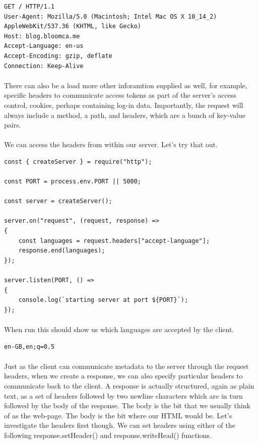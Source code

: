 \documentclass[10pt, a4paper, twosize]{article}
\begin{document}
\begin{lstlisting}
GET / HTTP/1.1
User-Agent: Mozilla/5.0 (Macintosh; Intel Mac OS X 10_14_2) AppleWebKit/537.36 (KHTML, like Gecko)
Host: blog.bloomca.me
Accept-Language: en-us
Accept-Encoding: gzip, deflate
Connection: Keep-Alive
\end{lstlisting}

\paragraph{} There can also be a load more other inforamtion supplied as well, for example, specific headers to communicate access tokens as part of the server's access control, cookies, perhaps containing log-in data. Importantly, the request will always include a method, a path, and headers, which are a bunch of key-value pairs.

\paragraph{} We can access the headers from within our server. Let's try that out.

\begin{lstlisting}
const { createServer } = require("http");

const PORT = process.env.PORT || 5000;

const server = createServer();

server.on("request", (request, response) => 
{
    const languages = request.headers["accept-language"];
    response.end(languages);  
});

server.listen(PORT, () => 
{
    console.log(`starting server at port ${PORT}`);
});

\end{lstlisting}

\paragraph{} When run this should show us which languages are accepted by the client.

\begin{lstlisting}
en-GB,en;q=0.5
\end{lstlisting}

\paragraph{} Just as the client can communicate metadata to the server through the request headers, when we create a response, we can also specify particular headers to communicate back to the client. A response is actually structured, again as plain text, as a set of headers followed by two newline characters which are in turn followed by the body of the response. The body is the bit that we usually think of as the web-page. The body is the bit where our HTML would be. Let's investigate the headers first though. We can set headers using either of the following response.setHeader() and response.writeHead() functions.
\end{document}
